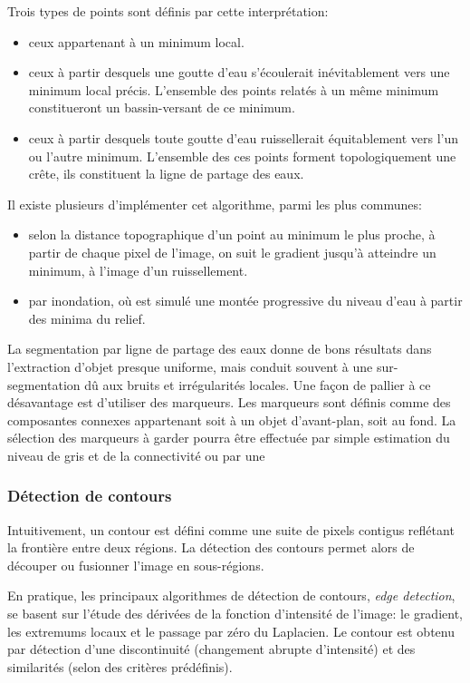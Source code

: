 \documentclass[a4paper,12pt]{report}
\begin{document}
Trois types de points sont définis par cette interprétation:
\begin{itemize}
\item ceux appartenant à un minimum local.
\item ceux à partir desquels une goutte d'eau s'écoulerait inévitablement vers une minimum local précis. L'ensemble des points relatés à un même minimum constitueront un bassin-versant de ce minimum.
\item ceux à partir desquels toute goutte d'eau ruissellerait équitablement vers l'un ou l'autre minimum. L'ensemble des ces points forment topologiquement une crête, ils constituent la ligne de partage des eaux.\\
\end{itemize} 
 

Il existe plusieurs d'implémenter cet algorithme, parmi les plus communes: 
\begin{itemize}
\item selon la distance topographique d'un point au minimum le plus proche, à partir de chaque pixel de l'image, on suit le gradient jusqu'à atteindre un minimum, à l'image d'un ruissellement.
\item par inondation, où est simulé une montée progressive du niveau d'eau à partir des minima du relief.\\
\end{itemize}

La segmentation par ligne de partage des eaux donne de bons résultats dans l'extraction d'objet presque uniforme, mais conduit souvent à une sur-segmentation dû aux bruits et irrégularités locales. Une façon de pallier à ce désavantage est d'utiliser des marqueurs. Les marqueurs sont définis comme des composantes connexes appartenant soit à un objet d'avant-plan, soit au fond. La sélection des marqueurs à garder pourra être effectuée par simple estimation du niveau de gris et de la connectivité ou par une   


\subsubsection{Détection de contours}
Intuitivement, un contour est défini comme une suite de pixels contigus reflétant la frontière entre deux régions. 
La détection des contours permet alors de découper ou fusionner l'image en sous-régions.

En pratique, les principaux algorithmes de détection de contours, \textit{edge detection}, se basent sur l'étude des dérivées de la fonction d'intensité de l'image: le gradient, les extremums locaux et le passage par zéro du Laplacien. Le contour est obtenu par détection d'une discontinuité (changement abrupte d'intensité) et des similarités (selon des critères prédéfinis).\\
\end{document}
